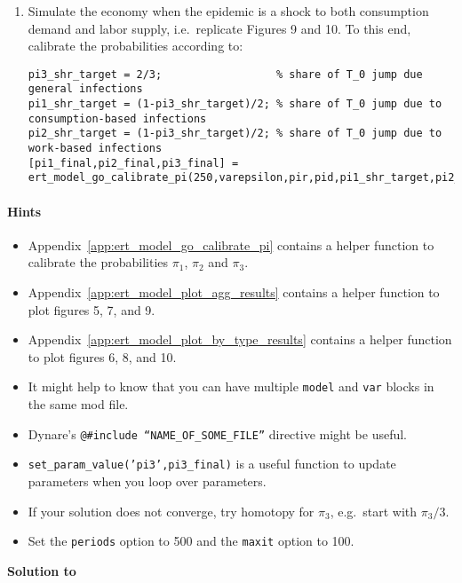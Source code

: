 \begin{enumerate}
\item
Simulate the economy when the epidemic is a shock to both consumption demand and labor supply,
  i.e.\ replicate Figures 9 and 10.
To this end, calibrate the probabilities according to:

{\footnotesize
\begin{lstlisting}[style=Matlab-editor,basicstyle=\mlttfamily\scriptsize]
pi3_shr_target = 2/3;                  % share of T_0 jump due general infections
pi1_shr_target = (1-pi3_shr_target)/2; % share of T_0 jump due to consumption-based infections
pi2_shr_target = (1-pi3_shr_target)/2; % share of T_0 jump due to work-based infections
[pi1_final,pi2_final,pi3_final] = ert_model_go_calibrate_pi(250,varepsilon,pir,pid,pi1_shr_target,pi2_shr_target,RplusD_target,c_ss,n_ss);
\end{lstlisting}
}
    
\end{enumerate}


\paragraph{Hints}

\begin{itemize}

\item Appendix~\ref{app:ert_model_go_calibrate_pi} contains a helper function to calibrate the probabilities \(\pi_1\), \(\pi_2\) and \(\pi_3\).
    
\item Appendix~\ref{app:ert_model_plot_agg_results} contains a helper function to plot figures 5, 7, and 9.

\item Appendix~\ref{app:ert_model_plot_by_type_results} contains a helper function to plot figures 6, 8, and 10.

\item It might help to know that you can have multiple \texttt{model} and \texttt{var} blocks in the same mod file.

\item Dynare's \texttt{@\#include ``NAME\_OF\_SOME\_FILE''} directive might be useful.

\item \texttt{set\_param\_value{('pi3',pi3\_final)}} is a useful function to update parameters when you loop over parameters.

\item If your solution does not converge, try homotopy for \(\pi_3\), e.g.\ start with \(\pi_3/3\).

\item Set the \texttt{periods} option to 500 and the \texttt{maxit} option to 100.

\end{itemize}


\begin{solution}\textbf{Solution to }
\ifDisplaySolutions%

\fi
\newpage
\end{solution}